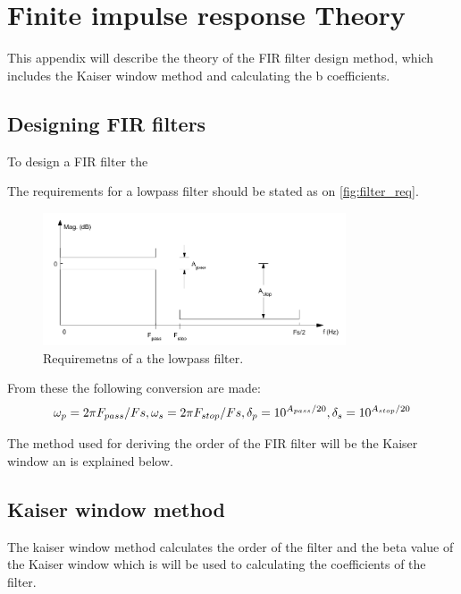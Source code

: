 \chapter{Finite impulse response Theory} \label{app:FIR_theory}
This appendix will describe the theory of the FIR filter design method, which includes the Kaiser window method and calculating the b coefficients.

\section{Designing FIR filters}

To design a FIR filter the 




The requirements for a lowpass filter should be stated as on \autoref{fig:filter_req}.
\begin{figure}[H]
\centering
\includegraphics[width=0.8\textwidth]{figures/filter_req.png}
\caption{Requiremetns of a the lowpass filter.}
\label{fig:filter_req}
\end{figure}
From these the following conversion are made:
\begin{equation}
\omega_p=2\pi F_{pass}/Fs,\\
\omega_s=2\pi F_{stop}/Fs,\\
\delta_p=10^{A_{pass}/20},\\
\delta_s=10^{A_{stop}/20}
\end{equation}

The method used for deriving the order of the FIR filter will be the Kaiser window an is explained below.

\section{Kaiser window method}
The kaiser window method calculates the order of the filter and the beta value of the Kaiser window which is will be used to calculating the coefficients of the filter.


